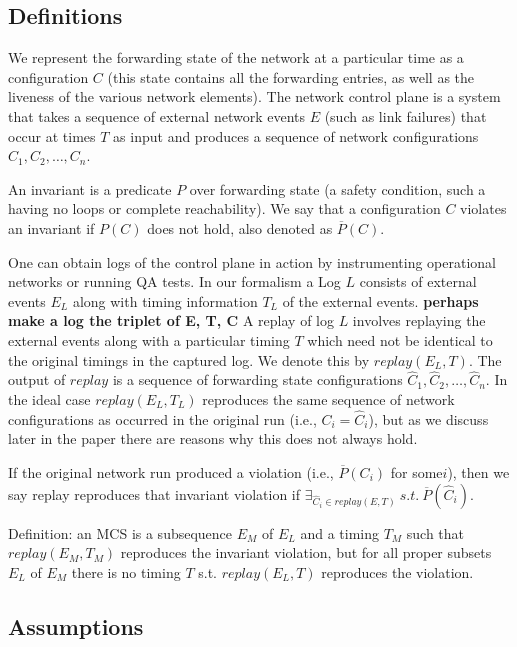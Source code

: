 \subsection{Definitions}

We represent the forwarding state of the network
at a particular time as a configuration $C$ (this state contains all the forwarding entries, as well as the liveness of the various network elements).
The network control plane is a system that takes a sequence of
external network events $E$ (such as link failures) that occur at times $T$
as input and produces a sequence of network configurations
$C_1,C_2,\dots,C_n$.

An invariant is a predicate $P$ over forwarding state (a safety
condition, such a having no loops or complete reachability). We say that a configuration
$C$ violates an invariant if $P(C)$ does not
hold, also denoted as $\overline{P}(C)$.

One can obtain logs of the control plane in action by instrumenting operational networks or running QA tests.  In our formalism a Log $L$ consists of external events $E_L$
along with timing information $T_L$ of the external events. {\bf perhaps make a log the triplet of E, T, C}
A replay of log $L$ involves replaying the external events along with a particular timing $T$ which need not be identical to the original timings in the captured log.
We denote this by $replay(E_L,T)$.  
The output of $replay$ is a sequence of forwarding state configurations
$\hat{C}_1,\hat{C}_2,\dots,\hat{C}_n$. In the ideal case $replay(E_L,T_L)$ reproduces the same sequence of network configurations as occurred in the original run (i.e., $C_i = \hat{C}_i$), but as we discuss later in the paper there are reasons why this does not always hold.

If the original network run produced a violation (i.e., $\overline{P}(C_i)$ for some$i$), then we say replay reproduces that invariant violation if
$\exists_{\hat{C}_i \in replay(E,T)}\:s.t.\:\overline{P}(\hat{C}_i)$.

Definition: an MCS is a subsequence $E_M$ of $E_L$ and a timing $T_M$ such
that $replay(E_M,T_M)$ reproduces the invariant violation, but for all proper
subsets $E_L$ of $E_M$
there is no timing $T$ s.t. $replay(E_L,T)$ reproduces the violation.
\\

\subsection{Assumptions}

